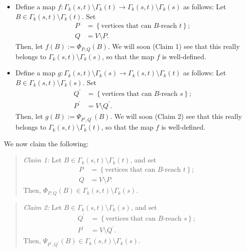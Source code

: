 \documentclass[numbers=enddot,12pt,final,onecolumn,notitlepage]{scrartcl}%
\theoremstyle{definition}
\newenvironment{statement}{\begin{quote}}{\end{quote}}
\theoremstyle{plainsl}
\begin{document}
\begin{itemize}
\item Define a map $f:\Gamma_{k}\left(  s,t\right)  \setminus\Gamma_{k}\left(
t\right)  \rightarrow\Gamma_{k}\left(  s,t\right)  \setminus\Gamma_{k}\left(
s\right)  $ as follows: Let $B\in\Gamma_{k}\left(  s,t\right)  \setminus
\Gamma_{k}\left(  t\right)  $. Set%
\begin{align*}
P  &  =\left\{  \text{vertices that can }B\text{-reach }t\right\}  ;\\
Q  &  =V\setminus P.
\end{align*}
Then, let $f\left(  B\right)  :=\Phi_{P,Q}\left(  B\right)  $. We will soon
(Claim 1) see that this really belongs to $\Gamma_{k}\left(  s,t\right)
\setminus\Gamma_{k}\left(  s\right)  $, so that the map $f$ is well-defined.

\item Define a map $g:\Gamma_{k}\left(  s,t\right)  \setminus\Gamma_{k}\left(
s\right)  \rightarrow\Gamma_{k}\left(  s,t\right)  \setminus\Gamma_{k}\left(
t\right)  $ as follows: Let $B\in\Gamma_{k}\left(  s,t\right)  \setminus
\Gamma_{k}\left(  s\right)  $. Set%
\begin{align*}
Q^{\prime}  &  =\left\{  \text{vertices that can }B\text{-reach }s\right\}
;\\
P^{\prime}  &  =V\setminus Q^{\prime}.
\end{align*}
Then, let $g\left(  B\right)  :=\Psi_{P^{\prime},Q^{\prime}}\left(  B\right)
$. We will soon (Claim 2) see that this really belongs to $\Gamma_{k}\left(
s,t\right)  \setminus\Gamma_{k}\left(  t\right)  $, so that the map $f$ is well-defined.
\end{itemize}

We now claim the following:

\begin{statement}
\textit{Claim 1:} Let $B\in\Gamma_{k}\left(  s,t\right)  \setminus\Gamma
_{k}\left(  t\right)  $, and set%
\begin{align*}
P &  =\left\{  \text{vertices that can }B\text{-reach }t\right\}  ;\\
Q &  =V\setminus P.
\end{align*}
Then, $\Phi_{P,Q}\left(  B\right)  \in\Gamma_{k}\left(  s,t\right)
\setminus\Gamma_{k}\left(  s\right)  $.
\end{statement}

\begin{statement}
\textit{Claim 2:} Let $B\in\Gamma_{k}\left(  s,t\right)  \setminus\Gamma
_{k}\left(  s\right)  $, and set%
\begin{align*}
Q^{\prime}  &  =\left\{  \text{vertices that can }B\text{-reach }s\right\}
;\\
P^{\prime}  &  =V\setminus Q^{\prime}.
\end{align*}
Then, $\Psi_{P^{\prime},Q^{\prime}}\left(  B\right)  \in\Gamma_{k}\left(
s,t\right)  \setminus\Gamma_{k}\left(  s\right)  $.
\end{statement}
\end{document}
